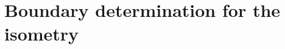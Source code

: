 \documentclass[12pt]{amsart}
\def\p{\partial}
\newtheorem{lemma}[theorem]{Lemma}
\theoremstyle{definition}
\theoremstyle{remark}
\begin{document}
\section{Boundary determination for the isometry}\label{appx:proof_of_lemma} 
% 
% 
% 
\end{document}
